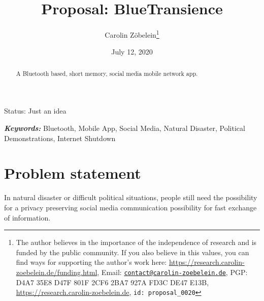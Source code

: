 \documentclass{article}
\newtheorem*{theorem A}{Theorem A}
\newtheorem*{theorem B}{N\"olker's Theorem}
\theoremstyle{remark}
\theoremstyle{remark}
\begin{document}
\title{Proposal: BlueTransience}
\author{Carolin Z\"obelein\thanks{The author believes in the importance of the independence of research and is funded by the public community. If you also believe in this values, you can find ways for supporting the author's work here: \url{https://research.carolin-zoebelein.de/funding.html}, Email: \href{mailto:contact@carolin-zoebelein.de}{\texttt{contact@carolin-zoebelein.de}}, PGP: D4A7 35E8 D47F 801F 2CF6 2BA7 927A FD3C DE47 E13B, \url{https://research.carolin-zoebelein.de}, \texttt{id: proposal\_0020}}}
\date{July 12, 2020}
\maketitle
\begin{center}
    Status: Just an idea
\end{center}
\begin{abstract}
    A Bluetooth based, short memory, social media mobile network app.
\end{abstract}
\providecommand{\keywords}[1]{\small{\textbf{\textit{Keywords:}} #1}}
\keywords{Bluetooth, Mobile App, Social Media, Natural Disaster, Political Demonstrations, Internet Shutdown}

\section{Problem statement}
\label{s:problemstatement}
In natural disaster or difficult political situations, people still need the possibility for a privacy preserving social media communication possibility for fast exchange of information.
\end{document}

